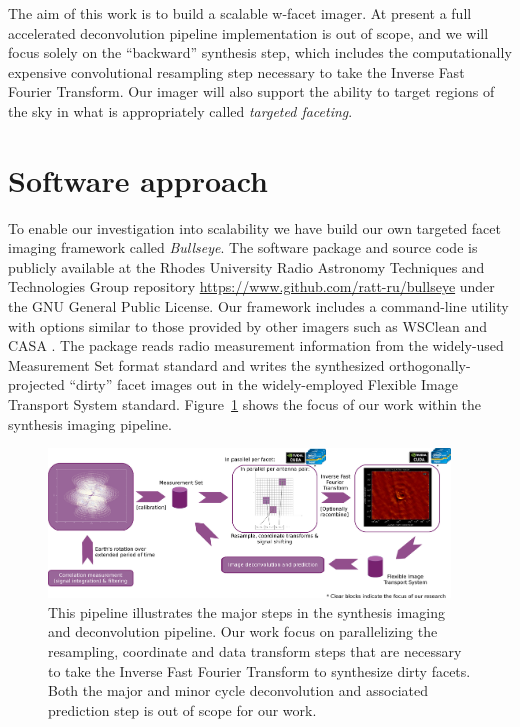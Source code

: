 The aim of this work is to build a scalable w-facet imager. At present a full accelerated deconvolution pipeline implementation is out of scope, and we will focus solely on the ``backward'' synthesis step,
which includes the computationally expensive convolutional resampling step necessary to take the Inverse Fast Fourier Transform. Our imager will also support the ability to target regions of the sky in what is
appropriately called \textit{targeted faceting}.

\section{Software approach}
To enable our investigation into scalability we have build our own targeted facet imaging framework called \textit{Bullseye}. The software package and source code is publicly available at the Rhodes University Radio Astronomy 
Techniques and Technologies Group repository \url{https://www.github.com/ratt-ru/bullseye} under the GNU General Public License. Our framework includes a command-line utility with options similar to those provided by other imagers such 
as WSClean \cite{offringa2014wsclean} and CASA \cite{jaeger2008common,mcmullin2007casa}. The package reads radio measurement information from the widely-used Measurement Set \cite{ms10,ms20} format standard and writes the synthesized 
orthogonally-projected ``dirty'' facet images out in the widely-employed Flexible Image Transport System \cite{pence2010definition,calabretta2002representations} standard. Figure~\ref{fig_aims_pipeline} shows the focus of our work
within the synthesis imaging pipeline.
\begin{figure}
 \begin{mdframed}
  \centering
  \includegraphics[width=0.95\textwidth]{images/aims_process.png}
  \caption[Aims of the work in this thesis and position in synthesis pipeline.]{This pipeline illustrates the major steps in the synthesis imaging and deconvolution pipeline. Our work focus on parallelizing the resampling,
	  coordinate and data transform steps that are necessary to take the Inverse Fast Fourier Transform to synthesize dirty facets. Both the major and minor cycle deconvolution and associated prediction step is out of scope for our work.}
  \label{fig_aims_pipeline}
 \end{mdframed}
\end{figure}

